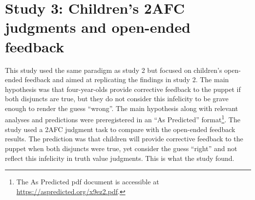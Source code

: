 \documentclass[oneside]{report}
\theoremstyle{definition}
\theoremstyle{definition}
\theoremstyle{definition}
\theoremstyle{remark}
\begin{document}
\section{Study 3: Children's 2AFC judgments and open-ended
feedback}\label{study-3-childrens-2afc-judgments-and-open-ended-feedback}

This study used the same paradigm as study 2 but focused on children's
open-ended feedback and aimed at replicating the findings in study 2.
The main hypothesis was that four-year-olds provide corrective feedback
to the puppet if both disjuncts are true, but they do not consider this
infelicity to be grave enough to render the guess ``wrong''. The main
hypothesis along with relevant analyses and predictions were
preregistered in an ``As Predicted'' format\footnote{The As Predicted
  pdf document is accessible at \url{https://aspredicted.org/x9ez2.pdf}.}.
The study used a 2AFC judgment task to compare with the open-ended
feedback results. The prediction was that children will provide
corrective feedback to the puppet when both disjuncts were true, yet
consider the guess ``right'' and not reflect this infelicity in truth
value judgments. This is what the study found.
\end{document}
